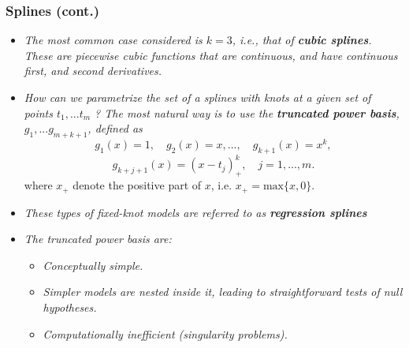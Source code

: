 \documentclass[11pt]{beamer}
\newcommand{\nologo}{\setbeamertemplate{logo}{}}
\begin{document}
{\nologo
\begin{frame}
 \frametitle{Splines (cont.)}
 \vspace{-.20cm}
{\footnotesize
\begin{itemize}[<+->]
\item {\it The most common case considered is $k= 3$,  i.e.,  that of {\bf cubic splines}.  These are piecewise cubic functions that are continuous, and have continuous first, and second derivatives.}
\item {\it How can we parametrize the set of a splines with knots at a given set of points $t_1,...t_m$
?  The most natural way is to use the {\bf truncated power basis}, $g_1,...g_{m+k+1}$, defined as}
$$
g_1(x) = 1,\quad g_2(x) = x,...,\quad g_{k+1}(x)=x^k,
$$ 
\vspace{-.2in}
$$
  g_{k+j+1}(x)= (x - t_j)^{k}_+,\quad j=1,...,m.
$$
where $x_+$ denote the positive part of $x$, i.e. $x_+ = \mbox{max}\{x,0\}$.

\item {\it These types of fixed-knot models are referred to as {\bf regression splines}}

\item {\it The truncated power basis are:}
 \begin{itemize}
  \item {\footnotesize \it Conceptually simple.}
  \item {\footnotesize \it Simpler models are nested inside it, leading to straightforward tests of null hypotheses.}
  \item {\footnotesize \it Computationally inefficient (singularity problems).}
 \end{itemize}  
\end{itemize}
}
\vfill

\vfill

\end{frame}
}
\end{document}
